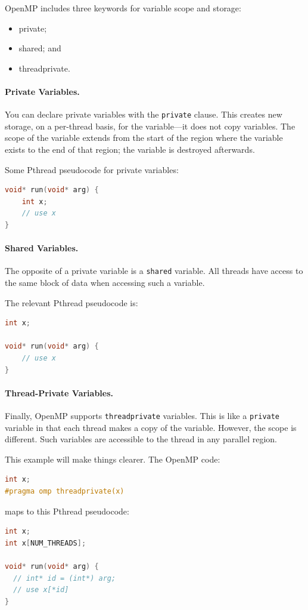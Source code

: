 \documentclass[a4paper]{report}
\begin{document}
OpenMP includes three keywords for variable scope and storage:
\begin{itemize}
        \item private;
        \item shared; and
        \item threadprivate.
\end{itemize}

\paragraph{Private Variables.} You can declare private variables
with the {\tt private} clause. This creates new storage, on a per-thread
basis, for the variable---it does not copy variables. The scope
of the variable extends from the start of the region where the variable
exists to the end of that region; the variable is destroyed afterwards.

Some Pthread pseudocode for private variables:

  \begin{lstlisting}[language=C]
void* run(void* arg) {
    int x;
    // use x
}
  \end{lstlisting}

\paragraph{Shared Variables.} The opposite of a private variable
is a {\tt shared} variable. All threads have access to the same block
of data when accessing such a variable.

The relevant Pthread pseudocode is:
  \begin{lstlisting}[language=C]
int x;

void* run(void* arg) {
    // use x
}
  \end{lstlisting}

\paragraph{Thread-Private Variables.} Finally, OpenMP supports 
{\tt threadprivate} variables. This is like a {\tt private} variable
in that each thread makes a copy of the variable. However, the scope 
is different. Such variables are accessible to the thread in any parallel region.

This example will make things clearer. The OpenMP code:
  \begin{lstlisting}[language=C]
int x;
#pragma omp threadprivate(x)
  \end{lstlisting}
  maps to this Pthread pseudocode:
  \begin{lstlisting}[language=C]
int x;
int x[NUM_THREADS];

void* run(void* arg) {
  // int* id = (int*) arg;
  // use x[*id]
}
  \end{lstlisting}
\end{document}
